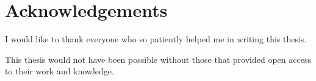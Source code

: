 \section*{Acknowledgements}


I would like to thank everyone who so patiently helped me in writing this 
thesis.

This thesis would not have been possible without those that provided open access
to their work and knowledge.